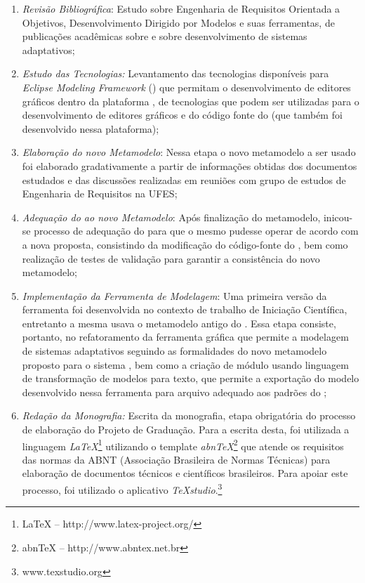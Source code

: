 \begin{enumerate}
	
	\item \textit{Revisão Bibliográfica}: Estudo sobre Engenharia de Requisitos Orientada a Objetivos, Desenvolvimento Dirigido por Modelos e suas ferramentas, de publicações acadêmicas sobre \zanshin e sobre desenvolvimento de sistemas adaptativos;
	
	\item \textit{Estudo das Tecnologias:} Levantamento das tecnologias disponíveis para \textit{Eclipse Modeling Framework} (\emf) que permitam o desenvolvimento de editores gráficos dentro da plataforma \eclipse, de tecnologias que podem ser utilizadas para o desenvolvimento de editores gráficos e do código fonte do \zanshin (que também foi desenvolvido nessa plataforma);
	
	\item \textit{Elaboração do novo Metamodelo}: Nessa etapa o novo metamodelo a ser usado foi elaborado gradativamente a partir de informações obtidas dos documentos estudados e das discussões realizadas em reuniões com grupo de estudos de Engenharia de Requisitos na UFES;
	
	\item \textit{Adequação do \zanshin ao novo Metamodelo}: Após finalização do metamodelo, inicou-se processo de adequação do \framework para que o mesmo pudesse operar de acordo com a nova proposta, consistindo da modificação do código-fonte do \zanshin, bem como realização de testes de validação para garantir a consistência do novo metamodelo;
	
	\item \textit{Implementação da Ferramenta de Modelagem}: Uma primeira versão da ferramenta foi desenvolvida no contexto de trabalho de Iniciação Científica, entretanto a mesma usava o metamodelo antigo do \zanshin. Essa etapa consiste, portanto, no refatoramento da ferramenta gráfica que permite a modelagem de sistemas adaptativos seguindo as formalidades do novo metamodelo proposto para o sistema \zanshin, bem como a criação de módulo usando linguagem de transformação de modelos para texto, que permite a exportação do modelo desenvolvido nessa ferramenta para arquivo \xml adequado aos padrões do \framework;
	
	\item \textit{Redação da Monografia:} Escrita da monografia, etapa obrigatória do processo de elaboração do Projeto de Graduação. Para a escrita desta, foi utilizada a linguagem \textit{LaTeX}\footnote{LaTeX -- http://www.latex-project.org/} utilizando o template \textit{abnTeX}\footnote{abnTeX -- http://www.abntex.net.br} que atende os requisitos das normas da ABNT (Associação Brasileira de Normas Técnicas) para elaboração de documentos técnicos e científicos brasileiros. Para apoiar este processo, foi utilizado o aplicativo \textit{TeXstudio}.\footnote{www.texstudio.org}
	
\end{enumerate}

